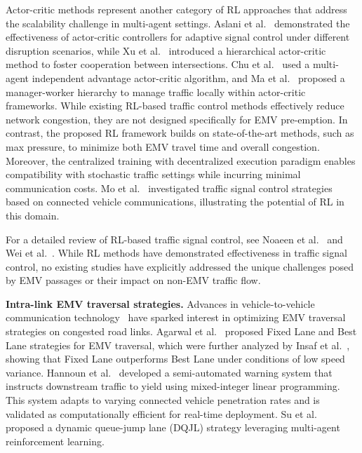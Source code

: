 Actor-critic methods represent another category of RL approaches that address the scalability challenge in multi-agent settings. Aslani et al.~\cite{aslani2017adaptive} demonstrated the effectiveness of actor-critic controllers for adaptive signal control under different disruption scenarios, while Xu et al.~\cite{xu2021hierarchically} introduced a hierarchical actor-critic method to foster cooperation between intersections. Chu et al.~\cite{chu2019multi} used a multi-agent independent advantage actor-critic algorithm, and Ma et al.~\cite{Ma2020Feudal} proposed a manager-worker hierarchy to manage traffic locally within actor-critic frameworks. While existing RL-based traffic control methods effectively reduce network congestion, they are not designed specifically for EMV pre-emption. In contrast, the proposed RL framework builds on state-of-the-art methods, such as max pressure, to minimize both EMV travel time and overall congestion. Moreover, the centralized training with decentralized execution paradigm enables compatibility with stochastic traffic settings while incurring minimal communication costs. Mo et al.~\cite{Mo2020CVLight} investigated traffic signal control strategies based on connected vehicle communications, illustrating the potential of RL in this domain.

For a detailed review of RL-based traffic signal control, see Noaeen et al.~\cite{RLSurvey2022Mohammad} and Wei et al.~\cite{wei2019survey}. While RL methods have demonstrated effectiveness in traffic signal control, no existing studies have explicitly addressed the unique challenges posed by EMV passages or their impact on non-EMV traffic flow.

\textbf{Intra-link EMV traversal strategies.}
Advances in vehicle-to-vehicle communication technology~\cite{LeBrun2005Knowledge} have sparked interest in optimizing EMV traversal strategies on congested road links. Agarwal et al.~\cite{Agarwal2016V2V} proposed Fixed Lane and Best Lane strategies for EMV traversal, which were further analyzed by Insaf et al.~\cite{Insaf2019Emergency}, showing that Fixed Lane outperforms Best Lane under conditions of low speed variance. Hannoun et al.~\cite{Hannoun2019Facilitating, hannoun2021sequential} developed a semi-automated warning system that instructs downstream traffic to yield using mixed-integer linear programming. This system adapts to varying connected vehicle penetration rates and is validated as computationally efficient for real-time deployment. Su et al.~\cite{su2021dynamic} proposed a dynamic queue-jump lane (DQJL) strategy leveraging multi-agent reinforcement learning.
